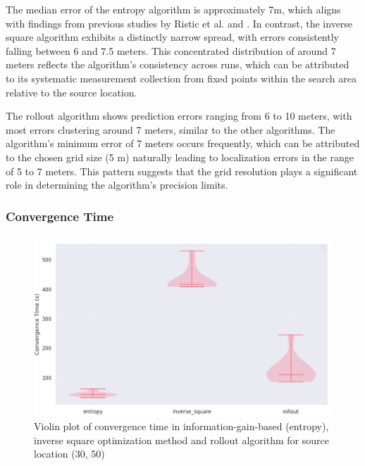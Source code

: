 \documentclass[../report.tex]{subfiles}
\begin{document}
    The median error of the entropy algorithm is approximately 7m, which aligns with findings from previous studies by Ristic et al. \cite{Ristic2007AnIG} and \cite{ristic2010information}. In 
    contrast, the inverse square algorithm exhibits a distinctly narrow spread, with errors consistently falling between 6 and 7.5 meters. This concentrated distribution of around 7 meters reflects 
    the algorithm's consistency across runs, which can be attributed to its systematic measurement collection from fixed points within the search area relative to the source location.

    The rollout algorithm shows prediction errors ranging from 6 to 10 meters, with most errors clustering around 7 meters, similar to the other algorithms. The algorithm's minimum error of 7 
    meters occurs frequently, which can be attributed to the chosen grid size (5 m) naturally leading to localization errors in the range of 5 to 7 meters. This pattern suggests that the grid 
    resolution plays a significant role in determining the algorithm's precision limits.

    \subsubsection{Convergence Time}

    \begin{figure}[ht]
        \centering
        \includegraphics[width=\linewidth]{figures/convergence_violin_plot.png}
        \caption{Violin plot of convergence time in information-gain-based (entropy), inverse square optimization method and rollout algorithm for source location (30, 50)}
        \label{fig:convergence_violin_plot}
    \end{figure}
\end{document}
